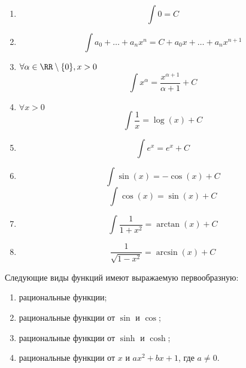 \documentclass[12pt,a4paper]{article}
\begin{document}
    \begin{lemma}\ 
        \begin{multicols}{2}
            \begin{enumerate}
                \item \[\int 0 = C\]
                \item \[\int a_0 + \dots + a_n x^n = C + a_0 x + \dots + a_n x^{n+1} \]
                \item $\forall \alpha \in \RR \setminus \{0\}, x > 0$
                    \[\int x^\alpha = \frac{x^{\alpha + 1}}{\alpha + 1} + C\]
                \item $\forall x > 0$
                    \[\int \frac{1}{x} = \log(x) + C\]
                \item \[\int e^x = e^x + C\]
                \item \[\int \sin(x) = -\cos(x) + C\] \[\int \cos(x) = \sin(x) + C\]
                \item \[\int \frac{1}{1+x^2} = \arctan(x) + C\]
                \item \[\frac{1}{\sqrt{1-x^2}} = \arcsin(x) + C\]
            \end{enumerate}
        \end{multicols}
    \end{lemma}

    \begin{theorem}
        Следующие виды функций имеют выражаемую первообразную:
        \begin{multicols}{2}
            \begin{enumerate}
                \item рациональные функции;
                \item рациональные функции от $\sin$ и $\cos$;
                \item рациональные функции от $\sinh$ и $\cosh$;
                \item рациональные функции от $x$ и $ax^2 + bx + 1$, где $a \neq 0$.
            \end{enumerate}
        \end{multicols}
    \end{theorem}
\end{document}
